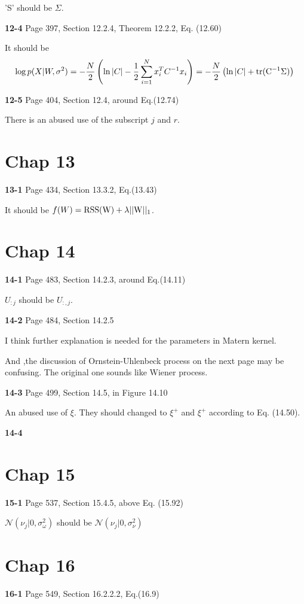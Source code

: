 \documentclass[aps,preprint,a4]{revtex4-1}
\newcommand{\nl}{\nonumber \\}
\begin{document}
'S' should be $\Sigma$.

{\color{red}\textbf{12-4}} Page 397, Section 12.2.4, Theorem 12.2.2, Eq. (12.60)

It should be
\begin{equation}
\log p(X|W,\sigma^{2}) = -\frac{N}{2}\left(\ln |C|-\frac{1}{2}\sum_{i=1}^{N}x_{i}^{T}C^{-1}x_{i}\right)
=  -\frac{N}{2}\left(\ln |C|+\rm tr(C^{-1}\Sigma)\right)\nl
\end{equation}

{\color{red}\textbf{12-5}} Page 404, Section 12.4, around Eq.(12.74)

There is an abused use of the subscript $j$ and $r$.

\section{Chap 13}
{\color{red}\textbf{13-1}} Page 434, Section 13.3.2, Eq.(13.43)

It should be $f(W) = \rm RSS(W) + \lambda||W||_{1}$.


\section{Chap 14}
{\color{red}\textbf{14-1}} Page 483, Section 14.2.3, around Eq.(14.11)

$U_{:j}$ should be $U_{:,j}$.

{\color{red}\textbf{14-2}} Page 484, Section 14.2.5

I think further explanation is needed for the parameters in Matern kernel.

And ,the discussion of Ornstein-Uhlenbeck process on the next page may be confusing.
The original one sounds like Wiener process.

{\color{red}\textbf{14-3}} Page 499, Section 14.5, in Figure 14.10

An abused use of $\xi$. They should changed to $\xi^{+}$ and $\xi^{+}$ according to
Eq. (14.50).

{\color{red}\textbf{14-4}}


\section{Chap 15}
{\color{red}\textbf{15-1}} Page 537, Section 15.4.5, above Eq. (15.92)

$\mathcal N(\nu_{j}|0,\sigma_{\omega}^{2})$ should be $\mathcal N(\nu_{j}|0,\sigma_{\nu}^{2})$


\section{Chap 16}
{\color{red}\textbf{16-1}} Page 549, Section 16.2.2.2, Eq.(16.9)
\end{document}
